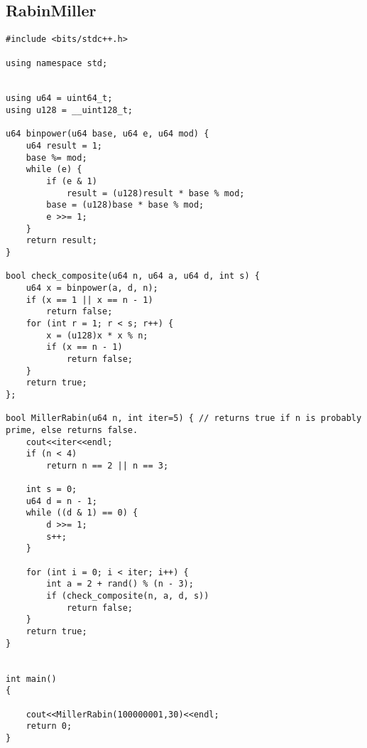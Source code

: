 \subsection*{RabinMiller}
\begin{lstlisting}
#include <bits/stdc++.h>

using namespace std;


using u64 = uint64_t;
using u128 = __uint128_t;

u64 binpower(u64 base, u64 e, u64 mod) {
    u64 result = 1;
    base %= mod;
    while (e) {
        if (e & 1)
            result = (u128)result * base % mod;
        base = (u128)base * base % mod;
        e >>= 1;
    }
    return result;
}

bool check_composite(u64 n, u64 a, u64 d, int s) {
    u64 x = binpower(a, d, n);
    if (x == 1 || x == n - 1)
        return false;
    for (int r = 1; r < s; r++) {
        x = (u128)x * x % n;
        if (x == n - 1)
            return false;
    }
    return true;
};

bool MillerRabin(u64 n, int iter=5) { // returns true if n is probably prime, else returns false.
    cout<<iter<<endl;
    if (n < 4)
        return n == 2 || n == 3;

    int s = 0;
    u64 d = n - 1;
    while ((d & 1) == 0) {
        d >>= 1;
        s++;
    }

    for (int i = 0; i < iter; i++) {
        int a = 2 + rand() % (n - 3);
        if (check_composite(n, a, d, s))
            return false;
    }
    return true;
}


int main()
{

    cout<<MillerRabin(100000001,30)<<endl;
    return 0;
}\end{lstlisting}

